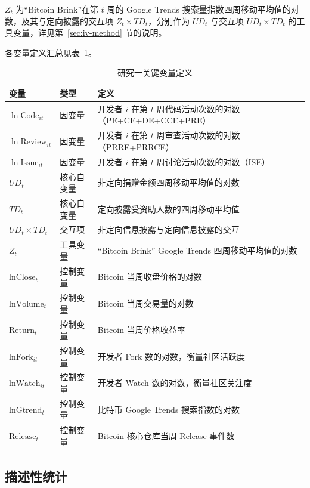 $Z_t$ 为“Bitcoin Brink”在第 $t$ 周的 Google Trends 搜索量指数四周移动平均值的对数，及其与定向披露的交互项 $Z_t \times TD_t$，分别作为 $UD_t$ 与交互项 $UD_t \times TD_t$ 的工具变量，详见第~\ref{sec:iv-method} 节的说明。

各变量定义汇总见表~\ref{tab:variables-1}。

\begin{table}[htbp]
    \centering
    \caption{研究一关键变量定义}
    \label{tab:variables-1}
    \begin{tabularx}{\textwidth}{p{5cm}p{1.8cm}X}
        \toprule
        变量 & 类型 & 定义 \\
        \midrule
        $\ln\text{Code}_{it}$ & 因变量 & 开发者 $i$ 在第 $t$ 周代码活动次数的对数（PE+CE+DE+CCE+PRE） \\
        $\ln\text{Review}_{it}$ & 因变量 & 开发者 $i$ 在第 $t$ 周审查活动次数的对数（PRRE+PRRCE） \\
        $\ln\text{Issue}_{it}$ & 因变量 & 开发者 $i$ 在第 $t$ 周讨论活动次数的对数（ISE） \\
        $UD_t$ & 核心自变量 & 非定向捐赠金额四周移动平均值的对数 \\
        $TD_t$ & 核心自变量 & 定向披露受资助人数的四周移动平均值 \\
        $UD_t \times TD_t$ & 交互项 & 非定向信息披露与定向信息披露的交互 \\
        $Z_t$ & 工具变量 & “Bitcoin Brink” Google Trends 四周移动平均值的对数 \\
        $\text{lnClose}_t$ & 控制变量 & Bitcoin 当周收盘价格的对数 \\
        $\text{lnVolume}_t$ & 控制变量 & Bitcoin 当周交易量的对数 \\
        $\text{Return}_t$ & 控制变量 & Bitcoin 当周价格收益率 \\
        $\text{lnFork}_{it}$ & 控制变量 & 开发者 Fork 数的对数，衡量社区活跃度 \\
        $\text{lnWatch}_{it}$ & 控制变量 & 开发者 Watch 数的对数，衡量社区关注度 \\
        $\text{lnGtrend}_t$ & 控制变量 & 比特币 Google Trends 搜索指数的对数 \\
        $\text{Release}_t$ & 控制变量 & Bitcoin 核心仓库当周 Release 事件数 \\
        \bottomrule
    \end{tabularx}
\end{table}

\subsection{描述性统计}

